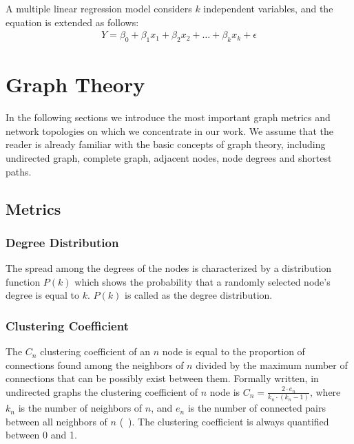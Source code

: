 A multiple linear regression model considers $k$ independent variables, and the equation is extended as follows:
\begin{align}
	Y = \beta_0 + \beta_1x_1 + \beta_2x_2 + \dots + \beta_kx_k + \epsilon
\end{align}

\section{Graph Theory}

In the following sections we introduce the most important graph metrics and network topologies on which we concentrate in our work. We assume that the reader is already familiar with the basic concepts of graph theory, including undirected graph, complete graph, adjacent nodes,
node degrees and shortest paths.
\subsection{Metrics}

\subsubsection{Degree Distribution}

The spread among the degrees of the nodes is characterized by a distribution function $P(k)$ which shows the probability that a randomly selected node's degree is equal to $k$. $P(k)$ is called as the degree distribution.

\subsubsection{Clustering Coefficient}

The $C_n$ clustering coefficient of an $n$ node is equal to the proportion of connections found among the neighbors of $n$ divided by the maximum number of connections that can be possibly exist between them. Formally written, in undirected graphs the clustering coefficient of $n$ node is $C_n = \frac{2\cdot e_n}{k_n\cdot(k_n-1) }$, where $k_n$ is the number of neighbors of $n$, and $e_n$ is the number of connected pairs between all neighbors of $n$ (~\cite{clustering_formula}). The clustering coefficient is always quantified between 0 and 1.

